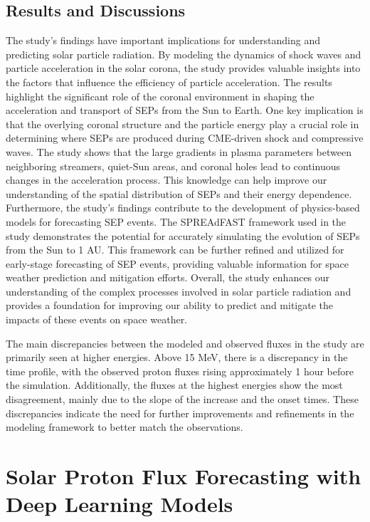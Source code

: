 \subsection{Results and Discussions}
The study's findings have important implications for understanding and predicting solar particle radiation. By modeling the dynamics of shock waves and particle acceleration in the solar corona, the study provides valuable insights into the factors that influence the efficiency of particle acceleration. The results highlight the significant role of the coronal environment in shaping the acceleration and transport of SEPs from the Sun to Earth. One key implication is that the overlying coronal structure and the particle energy play a crucial role in determining where SEPs are produced during CME-driven shock and compressive waves. The study shows that the large gradients in plasma parameters between neighboring streamers, quiet-Sun areas, and coronal holes lead to continuous changes in the acceleration process. This knowledge can help improve our understanding of the spatial distribution of SEPs and their energy dependence. Furthermore, the study's findings contribute to the development of physics-based models for forecasting SEP events. The SPREAdFAST framework used in the study demonstrates the potential for accurately simulating the evolution of SEPs from the Sun to 1 AU. This framework can be further refined and utilized for early-stage forecasting of SEP events, providing valuable information for space weather prediction and mitigation efforts. Overall, the study enhances our understanding of the complex processes involved in solar particle radiation and provides a foundation for improving our ability to predict and mitigate the impacts of these events on space weather.

The main discrepancies between the modeled and observed fluxes in the study are primarily seen at higher energies. Above 15 MeV, there is a discrepancy in the time profile, with the observed proton fluxes rising approximately 1 hour before the simulation. Additionally, the fluxes at the highest energies show the most disagreement, mainly due to the slope of the increase and the onset times. These discrepancies indicate the need for further improvements and refinements in the modeling framework to better match the observations.


\section{Solar Proton Flux Forecasting with Deep Learning Models}
